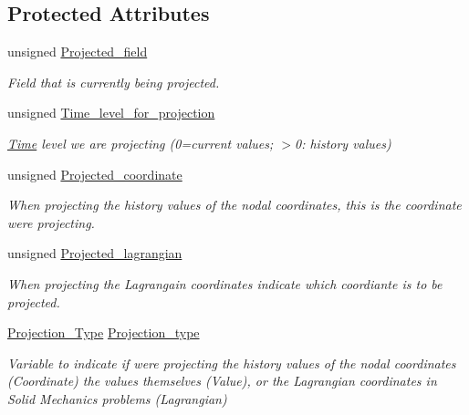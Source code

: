 \subsection*{Protected Attributes}
\begin{DoxyCompactItemize}
\item 
unsigned \hyperlink{classoomph_1_1ProjectableElementBase_aa71079c0f1075ac390708063fd7d2731}{Projected\+\_\+field}
\begin{DoxyCompactList}\small\item\em Field that is currently being projected. \end{DoxyCompactList}\item 
unsigned \hyperlink{classoomph_1_1ProjectableElementBase_a4698e178e500468c0af8c37bd47d0bd3}{Time\+\_\+level\+\_\+for\+\_\+projection}
\begin{DoxyCompactList}\small\item\em \hyperlink{classoomph_1_1Time}{Time} level we are projecting (0=current values; $>$0\+: history values) \end{DoxyCompactList}\item 
unsigned \hyperlink{classoomph_1_1ProjectableElementBase_ab712be6423145fae3c23e444187db0e2}{Projected\+\_\+coordinate}
\begin{DoxyCompactList}\small\item\em When projecting the history values of the nodal coordinates, this is the coordinate we\textquotesingle{}re projecting. \end{DoxyCompactList}\item 
unsigned \hyperlink{classoomph_1_1ProjectableElementBase_a1034f9a066d1e4116f5b6acf5e5a279c}{Projected\+\_\+lagrangian}
\begin{DoxyCompactList}\small\item\em When projecting the Lagrangain coordinates indicate which coordiante is to be projected. \end{DoxyCompactList}\item 
\hyperlink{classoomph_1_1ProjectableElementBase_aa6b28955725b5626cc4cbf0465f12a9e}{Projection\+\_\+\+Type} \hyperlink{classoomph_1_1ProjectableElementBase_a1081b0f4b3633612639f92d13a187db5}{Projection\+\_\+type}
\begin{DoxyCompactList}\small\item\em Variable to indicate if we\textquotesingle{}re projecting the history values of the nodal coordinates (Coordinate) the values themselves (Value), or the Lagrangian coordinates in Solid Mechanics problems (Lagrangian) \end{DoxyCompactList}\item 

\end{DoxyCompactItemize}
